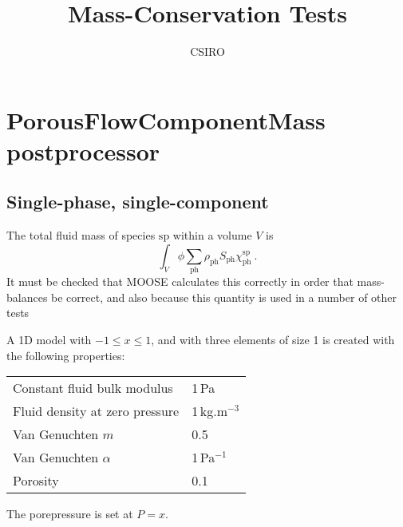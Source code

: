 \documentclass[]{scrreprt}
\def\species{\mathrm{sp}}
\def\phase{\mathrm{ph}}
\def\massfrac{\chi}
\begin{document}
\title{Mass-Conservation Tests}
\author{CSIRO}
\maketitle

\tableofcontents

\chapter{PorousFlowComponentMass postprocessor}

\section{Single-phase, single-component}
\label{1phase1comp.sec}

The total fluid mass of species $\species$ within a volume $V$ is
\begin{equation}
\int_{V} \phi\sum_{\phase}\rho_{\phase} S_{\phase}\massfrac_{\phase}^{\species} \ .
\end{equation}
It must be checked that MOOSE calculates this correctly in order that
mass-balances be correct, and also because this quantity is used in a
number of other tests

A 1D model with $-1\leq x \leq 1$, and with three elements of size 1 is
created with the following properties:
\begin{center}
\begin{tabular}{|ll|}
\hline
Constant fluid bulk modulus & 1\,Pa \\
Fluid density at zero pressure & 1\,kg.m$^{-3}$ \\
Van Genuchten $m$ & 0.5 \\
Van Genuchten $\alpha$ & 1\,Pa$^{-1}$ \\
Porosity & 0.1 \\
\hline
\end{tabular}
\end{center}
The porepressure is set at $P=x$.
\end{document}
